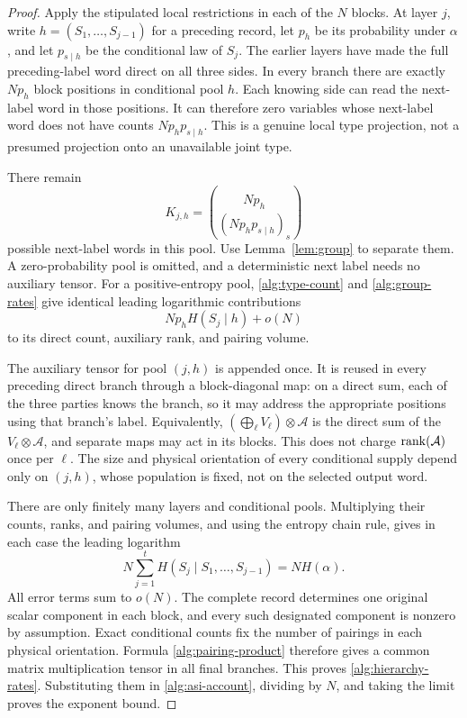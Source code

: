 \begin{proof}
Apply the stipulated local restrictions in each of the \(N\) blocks.
At layer \(j\), write \(h=(S_1,\ldots,S_{j-1})\) for a preceding
record, let \(p_h\) be its probability under \(\alpha\), and let
\(p_{s\mid h}\) be the conditional law of \(S_j\).
The earlier layers have made the full preceding-label word direct on all
three sides.  In every branch there are exactly \(Np_h\) block positions
in conditional pool \(h\).  Each knowing side can read the next-label
word in those positions.  It can therefore zero variables whose next-label
word does not have counts \(Np_hp_{s\mid h}\).  This is a genuine local
type projection, not a presumed projection onto an unavailable joint type.

There remain
\[
 K_{j,h}=\binom{Np_h}{(Np_hp_{s\mid h})_s}
\]
possible next-label words in this pool.  Use Lemma~\ref{lem:group} to
separate them.  A zero-probability pool is omitted, and a deterministic
next label needs no auxiliary tensor.  For a positive-entropy pool,
\eqref{alg:type-count} and \eqref{alg:group-rates} give identical leading
logarithmic contributions
\[
 Np_h H(S_j\mid h)+o(N)
\]
to its direct count, auxiliary rank, and pairing volume.

The auxiliary tensor for pool \((j,h)\) is appended once.  It is reused
in every preceding direct branch through a block-diagonal map: on a direct
sum, each of the three parties knows the branch, so it may address the
appropriate positions using that branch's label.  Equivalently,
\((\bigoplus_\ell V_\ell)\otimes\mathcal A\) is the direct sum of the
\(V_\ell\otimes\mathcal A\), and separate maps may act in its blocks.
This does not charge \(\operatorname{rank}(\mathcal A)\) once per \(\ell\).
The size and physical orientation of every conditional supply depend only
on \((j,h)\), whose population is fixed, not on the selected output word.

There are only finitely many layers and conditional pools.  Multiplying
their counts, ranks, and pairing volumes, and using the entropy chain rule,
gives in each case the leading logarithm
\[
 N\sum_{j=1}^t H(S_j\mid S_1,\ldots,S_{j-1})=NH(\alpha).
\]
All error terms sum to \(o(N)\).  The complete record determines one
original scalar component in each block, and every such designated
component is nonzero by assumption.  Exact conditional counts fix the
number of pairings in each physical orientation.  Formula
\eqref{alg:pairing-product} therefore gives a common matrix multiplication
tensor in all final branches.  This proves \eqref{alg:hierarchy-rates}.
Substituting them in \eqref{alg:asi-account}, dividing by \(N\), and taking
the limit proves the exponent bound.
\end{proof}

